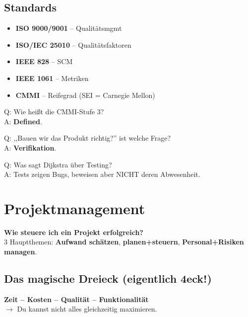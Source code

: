 \documentclass[11pt,a4paper]{article}
\begin{document}
\subsection{Standards}

\begin{keyfacts}
\begin{itemize}
  \item \textbf{ISO 9000/9001} -- Qualitätsmgmt
  \item \textbf{ISO/IEC 25010} -- Qualitätsfaktoren
  \item \textbf{IEEE 828} -- SCM
  \item \textbf{IEEE 1061} -- Metriken
  \item \textbf{CMMI} -- Reifegrad (SEI = Carnegie Mellon)
\end{itemize}
\end{keyfacts}

\begin{quickcheck}
Q: Wie heißt die CMMI-Stufe 3?\\
A: \textbf{Defined}.

Q: ,,Bauen wir das Produkt richtig?'' ist welche Frage?\\
A: \textbf{Verifikation}.

Q: Was sagt Dijkstra über Testing?\\
A: Tests zeigen Bugs, beweisen aber NICHT deren Abwesenheit.
\end{quickcheck}

\newpage
\section{Projektmanagement}

\begin{tldr}
\textbf{Wie steuere ich ein Projekt erfolgreich?}\\
3 Hauptthemen: \textbf{Aufwand schätzen}, \textbf{planen+steuern}, \textbf{Personal+Risiken managen}.
\end{tldr}

\subsection{Das magische Dreieck (eigentlich 4eck!)}

\begin{keyfacts}
\textbf{Zeit -- Kosten -- Qualität -- Funktionalität}\\
$\rightarrow$ Du kannst nicht alles gleichzeitig maximieren.
\end{keyfacts}
\end{document}
